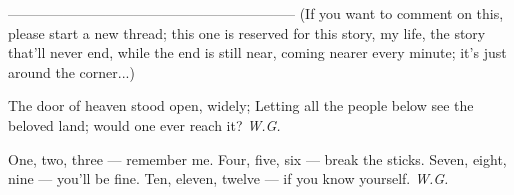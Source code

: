 --------------------------------------------------------------
(If you want to comment on this, please start a new thread; this one is reserved for this story, my life, the story that'll never end, while the end is still near, coming nearer every minute; it's just around the corner...)

The door of heaven stood open, 
widely; 
Letting all the people below 
see the beloved land; 
would one ever reach it? 
\emph{W.G.}

One, two, three --- 
remember me. 
Four, five, six --- 
break the sticks. 
Seven, eight, nine --- 
you'll be fine. 
Ten, eleven, twelve --- 
if you know yourself. 
\emph{W.G.}
